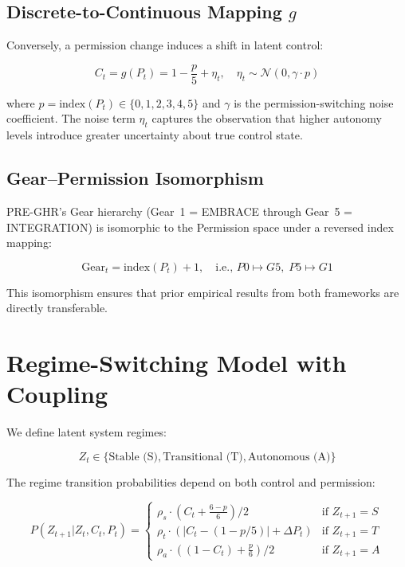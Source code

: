 \documentclass[conference]{IEEEtran}
\begin{document}
\subsection{Discrete-to-Continuous Mapping $g$}

Conversely, a permission change induces a shift in latent control:

\begin{equation}
C_t = g(P_t) = 1 - \frac{p}{5} + \eta_t, \quad \eta_t \sim \mathcal{N}(0, \gamma \cdot p)
\end{equation}

where $p = \text{index}(P_t) \in \{0,1,2,3,4,5\}$ and $\gamma$ is the permission-switching noise coefficient. The noise term $\eta_t$ captures the observation that higher autonomy levels introduce greater uncertainty about true control state.

\subsection{Gear--Permission Isomorphism}

PRE-GHR's Gear hierarchy (Gear~1 = EMBRACE through Gear~5 = INTEGRATION) is isomorphic to the Permission space under a reversed index mapping:

\begin{equation}
\text{Gear}_t = \text{index}(P_t) + 1, \quad \text{i.e., } P0 \mapsto G5,\; P5 \mapsto G1
\end{equation}

This isomorphism ensures that prior empirical results from both frameworks are directly transferable.

\section{Regime-Switching Model with Coupling}

We define latent system regimes:

\begin{equation}
Z_t \in \{\text{Stable (S)}, \text{Transitional (T)}, \text{Autonomous (A)}\}
\end{equation}

The regime transition probabilities depend on both control and permission:

\begin{equation}
P(Z_{t+1} | Z_t, C_t, P_t) = 
\begin{cases}
\rho_s \cdot (C_t + \frac{6-p}{6}) / 2 & \text{if } Z_{t+1} = S \\
\rho_t \cdot (|C_t - (1-p/5)| + \Delta P_t) & \text{if } Z_{t+1} = T \\
\rho_a \cdot ((1-C_t) + \frac{p}{6}) / 2 & \text{if } Z_{t+1} = A
\end{cases}
\end{equation}
\end{document}
